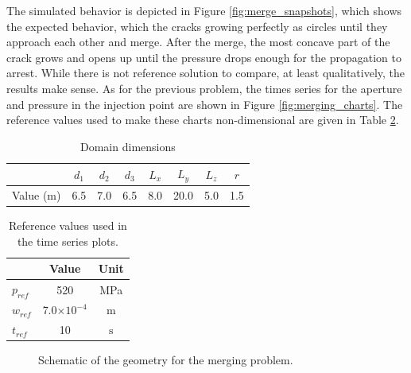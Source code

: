 The simulated behavior is depicted in Figure \ref{fig:merge_snapshots}, which shows the expected behavior, which the cracks growing perfectly as circles until they approach each other and merge. After the merge, the most concave part of the crack grows and opens up until the pressure drops enough for the propagation to arrest. While there is not reference solution to compare, at least qualitatively, the results make sense. As for the previous problem, the times series for the aperture and pressure in the injection point are shown in Figure \ref{fig:merging_charts}. The reference values used to make these charts non-dimensional are given in Table \ref{merging_refs}.

\begin{table}[ht]
  \centering
  \caption{Domain dimensions}
  \begin{tabular}[t]{lccccccc}
  \hline
  &$d_1$&$d_2$&$d_3$&$L_x$&$L_y$&$L_z$&$r$\\  
  \hline
  Value (m) & 6.5 & 7.0 & 6.5 & 8.0 & 20.0 & 5.0 & 1.5\\
  \hline
  \end{tabular}
  \label{merging_measures}
\end{table}%

\begin{table}[ht]
  \centering
  \caption{Reference values used in the time series plots.}
  \begin{tabular}[t]{lcc}
  \hline
  &Value &Unit \\
  \hline
  $p_{ref}$&520&MPa\\
  $w_{ref}$&7.0$\times 10^{-4}$&m\\
  $t_{ref}$&10&$\text{s}$\\
  \hline
  \end{tabular}
  \label{merging_refs}
\end{table}%

\begin{figure}[ht]
  \centering
  \caption{Schematic of the geometry for the merging problem.}
  \label{fig:merging_schematic}
\end{figure}


